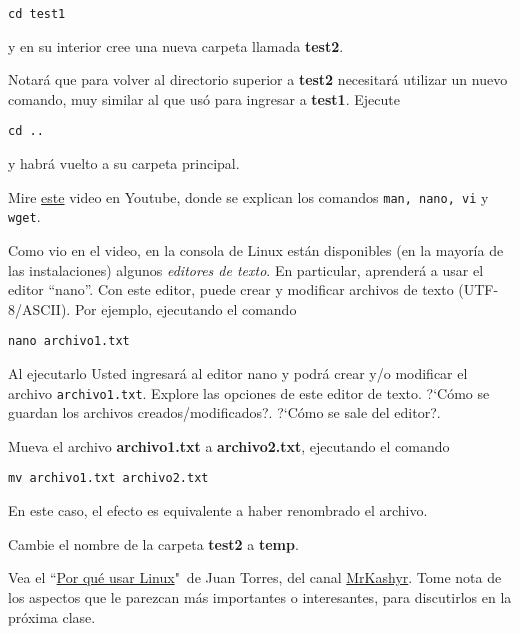 \documentclass[11pt]{exam}
\begin{document}
\begin{questions}
\begin{parts}
\begin{verbatim}
cd test1
\end{verbatim}

y en su interior cree una nueva carpeta llamada \textbf{test2}.

\item Notará que para volver al directorio superior a \textbf{test2} necesitará utilizar un nuevo comando, muy similar al que usó para ingresar a \textbf{test1}. Ejecute

\begin{verbatim}
cd ..
\end{verbatim}

y habrá vuelto a su carpeta principal.

\item Mire \href{https://www.youtube.com/watch?v=4Cz8E71PYd4}{este} video en Youtube, donde se explican los comandos \texttt{man, nano, vi} y \texttt{wget}.

\item Como vio en el video, en la consola de Linux están disponibles (en la mayoría de las instalaciones) algunos \textit{editores de texto}. En particular, aprenderá a usar el editor ``nano''. Con este editor, puede crear y modificar archivos de texto (UTF-8/ASCII). Por ejemplo, ejecutando el comando 

\begin{verbatim}
nano archivo1.txt
\end{verbatim}

Al ejecutarlo Usted ingresará al editor nano y podrá crear y/o modificar el archivo \texttt{archivo1.txt}.
 Explore las opciones de este editor de texto. ?`Cómo se guardan los archivos creados/modi\-fi\-ca\-dos?. ?`Cómo se sale del editor?.

\item Mueva el archivo \textbf{archivo1.txt} a \textbf{archivo2.txt}, ejecutando el comando

\begin{verbatim}
mv archivo1.txt archivo2.txt
\end{verbatim}

En este caso, el efecto es equivalente a haber renombrado el archivo.

\item Cambie el nombre de la carpeta \textbf{test2} a \textbf{temp}.

\end{parts}

\item Vea el ``\href{https://youtu.be/p6rSvMrOpeo}{Por qué usar Linux}"\, de Juan Torres, del canal \href{https://www.youtube.com/channel/UCk5zxKnvQkKdmLJzh-E6tKA}{MrKashyr}. Tome nota de los aspectos que le parezcan más importantes o interesantes, para discutirlos en la próxima clase.


\end{questions}
\end{document}
